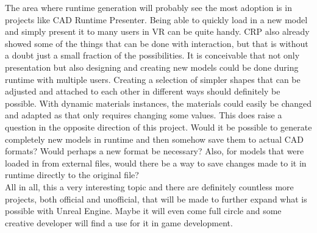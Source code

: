 The area where runtime generation will probably see the most adoption is in projects like CAD Runtime Presenter. Being able to quickly load in a new model and simply present it to many users in VR can be quite handy. \acs{CRP} also already showed some of the things that can be done with interaction, but that is without a doubt just a small fraction of the possibilities. It is conceivable that not only presentation but also designing and creating new models could be done during runtime with multiple users. Creating a selection of simpler shapes that can be adjusted and attached to each other in different ways should definitely be possible. With dynamic materials instances, the materials could easily be changed and adapted as that only requires changing some values. This does raise a question in the opposite direction of this project. Would it be possible to generate completely new models in runtime and then somehow save them to actual CAD formats? Would perhaps a new format be necessary? Also, for models that were loaded in from external files, would there be a way to save changes made to it in runtime directly to the original file?\\
All in all, this a very interesting topic and there are definitely countless more projects, both official and unofficial, that will be made to further expand what is possible with Unreal Engine. Maybe it will even come full circle and some creative developer will find a use for it in game development.
